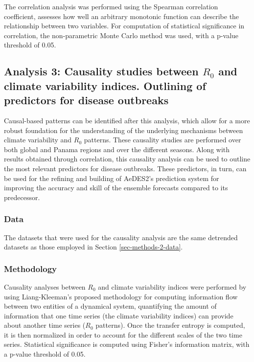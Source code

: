 \documentclass[10pt,twocolumn]{wlscirep}
\begin{document}
The correlation analysis was performed using the Spearman correlation coefficient, assesses how well an arbitrary monotonic function can describe the relationship between two variables\cite{spearman_1904}. For computation of statistical significance in correlation, the non-parametric Monte Carlo method was used\cite{new_2000}, with a p-value threshold of 0.05.

\subsection{Analysis 3: Causality studies between $R_0$ and climate variability indices. Outlining of predictors for disease outbreaks} \label{sec-methods-3}

Causal-based patterns can be identified after this analysis, which allow for a more robust foundation for the understanding of the underlying mechanisms between climate variability and $R_0$ patterns. These causality studies are performed over both global and Panama regions and over the different seasons. Along with results obtained through correlation, this causality analysis can be used to outline the most relevant predictors for disease outbreaks. These predictors, in turn, can be used for the refining and building of AeDES2's prediction system for improving the accuracy and skill of the ensemble forecasts compared to its predecessor.

\subsubsection{Data} \label{sec-methods-3-data}

The datasets that were used for the causality analysis are the same detrended datasets as those employed in Section \ref{sec-methods-2-data}.

\subsubsection{Methodology} \label{sec-methods-3-methodology}

Causality analyses between $R_0$ and climate variability indices were performed by using Liang-Kleeman's proposed methodology for computing information flow between two entities of a dynamical system, quantifying the amount of information that one time series (the climate variability indices) can provide about another time series ($R_0$ patterns)\cite{liang_2014}. Once the transfer entropy is computed, it is then normalized in order to account for the different scales of the two time series\cite{liang_2015}. Statistical significance is computed using Fisher's information matrix, with a p-value threshold of 0.05.
\end{document}
